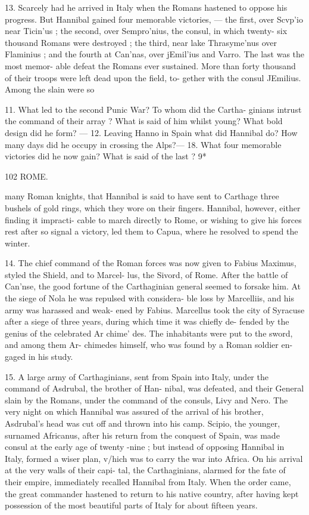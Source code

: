 \documentclass[openany,a4paper]{memoir}
\begin{document}
13. Scarcely had he arrived in Italy when the Romans 
hastened to oppose his progress. But Hannibal gained four 
memorable victories, — the first, over Scvp'io near Ticin'us ; 
the second, over Sempro'nius, the consul, in which twenty- 
six thousand Romans were destroyed ; the third, near lake 
Thrasyme'nus over Flaminius ; and the fourth at Can'nas, 
over jEmil'ius and Varro. The last was the most memor- 
able defeat the Romans ever sustained. More than forty 
thousand of their troops were left dead upon the field, to- 
gether with the consul JEmilius. Among the slain were so 

11. What led to the second Punic War? To whom did the Cartha- 
ginians intrust the command of their array ? What is said of him whilst 
young? What bold design did he form? — 12. Leaving Hanno in Spain 
what did Hannibal do? How many days did he occupy in crossing the 
Alps?— 18. What four memorable victories did he now gain? What 
is said of the last ? 
9* 



102 ROME. 

many Roman knights, that Hannibal is said to have sent to 
Carthage three bushels of gold rings, which they wore on 
their fingers. Hannibal, however, either finding it impracti- 
cable to march directly to Rome, or wishing to give his forces 
rest after so signal a victory, led them to Capua, where he 
resolved to spend the winter. 

14. The chief command of the Roman forces was now 
given to Fabius Maximus, styled the Shield, and to Marcel- 
lus, the Sivord, of Rome. After the battle of Can'nse, the 
good fortune of the Carthaginian general seemed to forsake 
him. At the siege of Nola he was repulsed with considera- 
ble loss by Marcelliis, and his army was harassed and weak- 
ened by Fabius. Marcellus took the city of Syracuse after 
a siege of three years, during which time it was chiefly de- 
fended by the genius of the celebrated Ar chime' des. The 
inhabitants were put to the sword, and among them Ar- 
chimedes himself, who was found by a Roman soldier en- 
gaged in his study. 

15. A large army of Carthaginians, sent from Spain into 
Italy, under the command of Asdrubal, the brother of Han- 
nibal, was defeated, and their General slain by the Romans, 
under the command of the consuls, Livy and Nero. The 
very night on which Hannibal was assured of the arrival of 
his brother, Asdrubal's head was cut off and thrown into his 
camp. Scipio, the younger, surnamed Africanus, after his 
return from the conquest of Spain, was made consul at the 
early age of twenty -nine ; but instead of opposing Hannibal 
in Italy, formed a wiser plan, v/hich was to carry the war 
into Africa. On his arrival at the very walls of their capi- 
tal, the Carthaginians, alarmed for the fate of their empire, 
immediately recalled Hannibal from Italy. When the order 
came, the great commander hastened to return to his native 
country, after having kept possession of the most beautiful 
parts of Italy for about fifteen years. 
\end{document}
